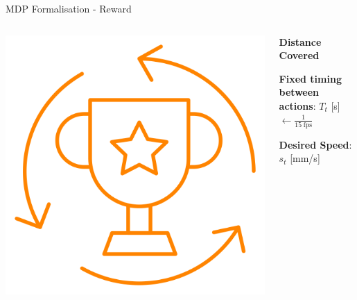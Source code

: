 \documentclass[aspectratio=169]{beamer}
\begin{document}
\begin{frame}{MDP Formalisation - Reward}
	\begin{columns}
		\begin{column}{0.4\linewidth}
			\centering
			\includegraphics[width=0.8\linewidth]{img/reward.png}
		\end{column}
		\begin{column}{0.6\linewidth}
			\centering
			\textbf{Distance Covered}

			\textbf{Fixed timing between actions}: $T_t$ [s] $\leftarrow \frac{1}{15 \;\text{fps}}$

			\textbf{Desired Speed}: $s_t$ [mm/s]

			\vspace{-5mm}
		\end{column}
	\end{columns}
\end{frame}
\end{document}
